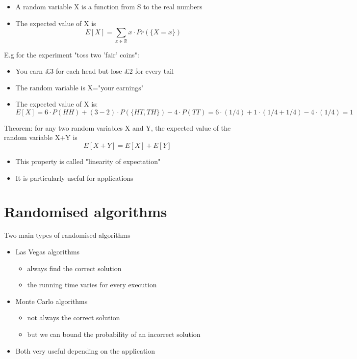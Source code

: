 \documentclass{article}[18pt]
\begin{document}
\begin{itemize}
	\item A random variable X is a function from S to the real numbers
	\item The expected value of X is 
	$$E[X]=\sum_{x\in \mathbb{R}} x\cdot Pr(\{X=x\})$$
\end{itemize}
E.g for the experiment "toss two 'fair' coins":
\begin{itemize}
	\item You earn £3 for each head but lose £2 for every tail
	\item The random variable is X="your earnings"
	\item The expected value of X is:
	$$E [ X ] = 6 \cdot P ( H H ) + ( 3 - 2 ) \cdot P ( \{ H T , T H \} ) - 4 \cdot P ( T T )= 6 \cdot ( 1 / 4 ) + 1 \cdot ( 1 / 4 + 1 / 4 ) - 4 \cdot ( 1 / 4 ) = 1$$
\end{itemize}
Theorem: for any two random variables X and Y, the expected value of the random variable X+Y is
$$E[X+Y]=E[X]+E[Y]$$
\begin{itemize}
	\item This property is called "linearity of expectation"
	\item It is particularly useful for applications
\end{itemize}
\section{Randomised algorithms}
Two main types of randomised algorithms
\begin{itemize}
	\item Las Vegas algorithms
	\begin{itemize}
		\item always find the correct solution
		\item the running time varies for every execution
	\end{itemize}
	\item Monte Carlo algorithms
	\begin{itemize}
		\item not always the correct solution
		\item but we can bound the probability of an incorrect solution
	\end{itemize}
	\item Both very useful depending on the application
\end{itemize}
\end{document}
